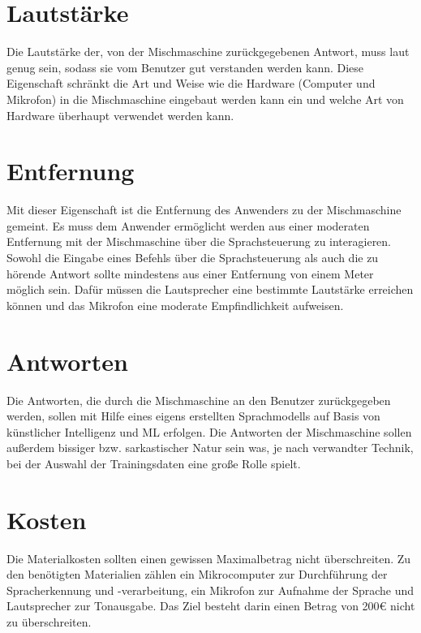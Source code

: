 \section{Lautstärke}
Die Lautstärke der, von der Mischmaschine zurückgegebenen Antwort, muss laut genug sein, sodass sie vom Benutzer gut verstanden werden kann. Diese Eigenschaft schränkt die Art und Weise wie die Hardware (Computer und Mikrofon) in die Mischmaschine eingebaut werden kann ein und welche Art von Hardware überhaupt verwendet werden kann.
\section{Entfernung}
Mit dieser Eigenschaft ist die Entfernung des Anwenders zu der Mischmaschine gemeint. Es muss dem Anwender ermöglicht werden aus einer moderaten Entfernung mit der Mischmaschine über die Sprachsteuerung zu interagieren. Sowohl die Eingabe eines Befehls über die Sprachsteuerung als auch die zu hörende Antwort sollte mindestens aus einer Entfernung von einem Meter möglich sein. Dafür müssen die Lautsprecher eine bestimmte Lautstärke erreichen können und das Mikrofon eine moderate Empfindlichkeit aufweisen.
\section{Antworten}
Die Antworten, die durch die Mischmaschine an den Benutzer zurückgegeben werden, sollen mit Hilfe eines eigens erstellten Sprachmodells auf Basis von künstlicher Intelligenz und \ac{ML} erfolgen. Die Antworten der Mischmaschine sollen außerdem bissiger bzw. sarkastischer Natur sein was, je nach verwandter Technik, bei der Auswahl der Trainingsdaten eine große Rolle spielt.  
\section{Kosten}
Die Materialkosten sollten einen gewissen Maximalbetrag nicht überschreiten. Zu den benötigten Materialien zählen ein Mikrocomputer zur Durchführung der Spracherkennung und -verarbeitung, ein Mikrofon zur Aufnahme der Sprache und Lautsprecher zur Tonausgabe. Das Ziel besteht darin einen Betrag von 200€ nicht zu überschreiten.
